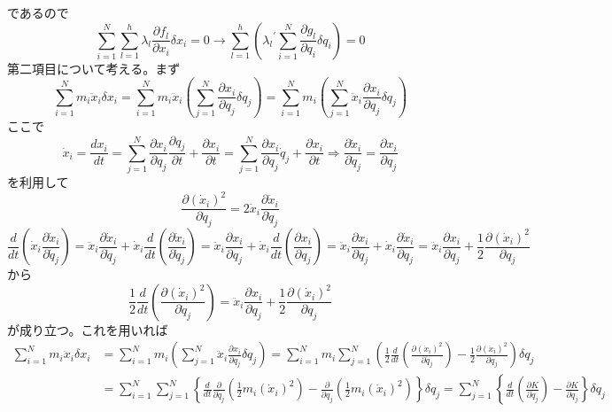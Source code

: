 \documentclass{jsarticle}
\begin{document}
であるので
\[\sum_{i=1}^{N}\sum_{l=1}^{h}\lambda_{l}\frac{\partial f_{l}}{\partial x_{i}}\delta x_{i}=0\longrightarrow\sum_{l=1}^{h}\left({\lambda_{l}}^{\prime}\sum_{i=1}^{N}\frac{\partial g_{l}}{\partial q_{i}}\delta q_{i}\right)=0\]
第二項目について考える。まず
\[\sum_{i=1}^{N}m_{i}\ddot{x}_{i}\delta x_{i}=\sum_{i=1}^{N}m_{i}\ddot{x}_{i}\left(\sum_{j=1}^{N}\frac{\partial x_{i}}{\partial q_{j}}\delta q_{j}\right)=\sum_{i=1}^{N}m_{i}\left(\sum_{j=1}^{N}\ddot{x}_{i}\frac{\partial x_{i}}{\partial q_{j}}\delta q_{j}\right)\]
ここで
\[\dot{x}_{i}=\frac{d x_{i}}{dt}=\sum_{j=1}^{N}\frac{\partial x_{i}}{\partial q_{j}}\frac{\partial q_{j}}{\partial t}+\frac{\partial x_{i}}{\partial t}=\sum_{j=1}^{N}\frac{\partial x_{i}}{\partial q_{j}}\dot{q}_{j}+\frac{\partial x_{i}}{\partial t}\Longrightarrow\frac{\partial \dot{x}_{i}}{\partial \dot{q}_{j}}=\frac{\partial x_{i}}{\partial q_{j}}\]
を利用して
\[\frac{\partial(\dot{x}_{i})^{2}}{\partial\dot{q}_{j}}=2\dot{x}_{i}\frac{\partial\dot{x}_{i}}{\partial\dot{q}_{j}}\]
\[\frac{d}{dt}\left(\dot{x}_{i}\frac{\partial\dot{x}_{i}}{\partial\dot{q}_{j}}\right)=\ddot{x}_{i}\frac{\partial\dot{x}_{i}}{\partial\dot{q}_{j}}+\dot{x}_{i}\frac{d}{dt}\left(\frac{\partial\dot{x}_{i}}{\partial\dot{q}_{j}}\right)=\ddot{x}_{i}\frac{\partial x_{i}}{\partial q_{j}}+\dot{x}_{i}\frac{d}{dt}\left(\frac{\partial x_{i}}{\partial q_{j}}\right)=\ddot{x}_{i}\frac{\partial x_{i}}{\partial q_{j}}+\dot{x}_{i}\frac{\partial\dot{x}_{i}}{\partial q_{j}}=\ddot{x}_{i}\frac{\partial x_{i}}{\partial q_{j}}+\frac{1}{2}\frac{\partial(\dot{x}_{i})^{2}}{\partial q_{j}}\]
から
\[\frac{1}{2}\frac{d}{dt}\left(\frac{\partial(\dot{x}_{i})^{2}}{\partial\dot{q}_{j}}\right)=\ddot{x}_{i}\frac{\partial x_{i}}{\partial q_{j}}+\frac{1}{2}\frac{\partial(\dot{x}_{i})^{2}}{\partial q_{j}}\]
が成り立つ。これを用いれば
\begin{align*}
\sum_{i=1}^{N}m_{i}\ddot{x}_{i}\delta x_{i}&=\sum_{i=1}^{N}m_{i}\left(\sum_{j=1}^{N}\ddot{x}_{i}\frac{\partial x_{i}}{\partial q_{j}}\delta q_{j}\right)=\sum_{i=1}^{N}m_{i}\sum_{j=1}^{N}\left(\frac{1}{2}\frac{d}{dt}\left(\frac{\partial(\dot{x}_{i})^{2}}{\partial\dot{q}_{j}}\right)-\frac{1}{2}\frac{\partial(\dot{x}_{i})^{2}}{\partial q_{j}}\right)\delta q_{j}\\
&=\sum_{i=1}^{N}\sum_{j=1}^{N}\left\{\frac{d}{dt}\frac{\partial}{\partial\dot{q}_{j}}\left(\frac{1}{2}m_{i}(\dot{x}_{i})^{2}\right)-\frac{\partial}{\partial q_{j}}\left(\frac{1}{2}m_{i}(\dot{x}_{i})^{2}\right)\right\}\delta q_{j}=\sum_{j=1}^{N}\left\{\frac{d}{dt}\left(\frac{\partial K}{\partial\dot{q}_{j}}\right)-\frac{\partial K}{\partial q_{j}}\right\}\delta q_{j}
\end{align*}
\end{document}
